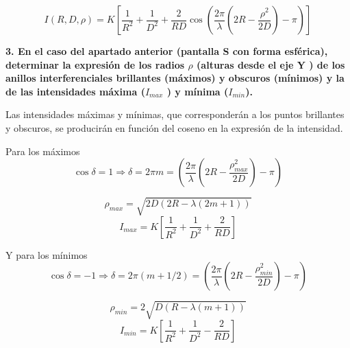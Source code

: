\documentclass[a4paper,12pt,spanish]{article}
\begin{document}
\[ \boxed{ I(R,D,\rho) = K \left[\frac{1}{R^2}+\frac{1}{D^2} + \frac{2}{RD} \cos\left(\frac{2\pi}{\lambda} \left(2R - \frac{\rho^2}{2D}\right) - \pi\right) \right] }
\]



\vspace{\baselineskip}
\textbf{	3. En el caso del apartado anterior (pantalla S con forma esférica), determinar
	la expresión de los radios $\rho$ (alturas desde el eje Y ) de los anillos interferenciales brillantes (máximos) y obscuros (mínimos) y la de las intensidades máxima ($I_{max}$ ) y mínima ($I_{min}$).
}
\vspace{\baselineskip}

Las intensidades máximas y mínimas, que corresponderán a los puntos brillantes y obscuros, se producirán en función del coseno en la expresión de la intensidad.

Para los máximos
\[ \cos \delta = 1 \Longrightarrow \delta = 2\pi m = \left(\frac{2\pi}{\lambda} \left(2R - \frac{\rho_{max}^2}{2D}\right) - \pi\right)
\]

\[\boxed{ \rho_{max} = \sqrt{2D(2R-\lambda(2m+1))}}
\]
\[ \boxed{ I_{max} =  K \left[\frac{1}{R^2}+\frac{1}{D^2} + \frac{2}{RD}  \right]    }
\]

Y para los mínimos
\[ \cos \delta = -1 \Longrightarrow \delta = 2\pi (m+1/2) = \left(\frac{2\pi}{\lambda} \left(2R - \frac{\rho_{min}^2}{2D}\right) - \pi\right)
\]

\[\boxed{ \rho_{min} = 2\sqrt{D(R-\lambda(m+1))}}
\]
\[ \boxed{ I_{min} =  K \left[\frac{1}{R^2}+\frac{1}{D^2} - \frac{2}{RD}  \right]    }
\]
\end{document}
